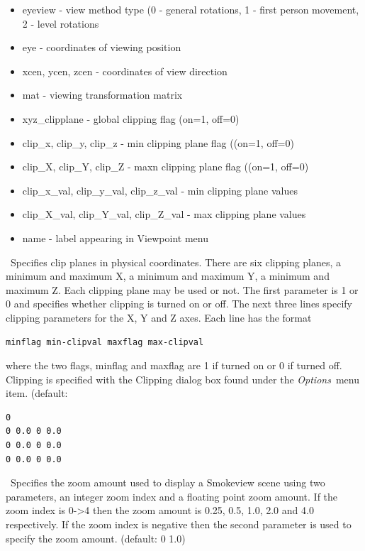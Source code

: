 \documentclass[11pt,twoside]{book}
\begin{document}
\begin{itemize}
\item eyeview - view method type (0 - general rotations,
1 - first person movement, 2 - level rotations
\item eye - coordinates of viewing position
\item xcen, ycen, zcen - coordinates of view direction
\item mat - viewing transformation matrix
\item xyz\_clipplane - global clipping flag (on=1, off=0)
\item clip\_x, clip\_y, clip\_z - min clipping plane flag ((on=1, off=0)
\item clip\_X, clip\_Y, clip\_Z - maxn clipping plane flag ((on=1, off=0)
\item clip\_x\_val, clip\_y\_val, clip\_z\_val - min clipping plane values
\item clip\_X\_val, clip\_Y\_val, clip\_Z\_val - max clipping plane values
\item name - label appearing in Viewpoint menu
\end{itemize}

\ Specifies clip planes in physical
coordinates. There are six clipping planes, a minimum and
maximum X, a minimum and maximum Y, a minimum and maximum
Z. Each clipping plane may be used or not. The first
parameter is 1 or 0 and specifies whether clipping is
turned on or off. The next three lines specify clipping
parameters for the X, Y and Z axes.  Each line has the
format

\begin{lstlisting}
minflag min-clipval maxflag max-clipval
\end{lstlisting}

where the two flags, minflag and maxflag are 1 if turned on or 0
if turned off. Clipping is specified with the Clipping
dialog box found under the {\em Options}\ menu item.
 (default:
\begin{lstlisting}
0
0 0.0 0 0.0
0 0.0 0 0.0
0 0.0 0 0.0
\end{lstlisting}

\ Specifies the zoom amount used to display a Smokeview
scene using two parameters, an integer zoom index and a floating
point zoom amount.  If the zoom index is 0->4 then the zoom amount
is 0.25, 0.5, 1.0, 2.0 and 4.0 respectively.  If the zoom index is
negative then the second parameter is used to specify the zoom
amount. (default: 0 1.0)
\end{document}

